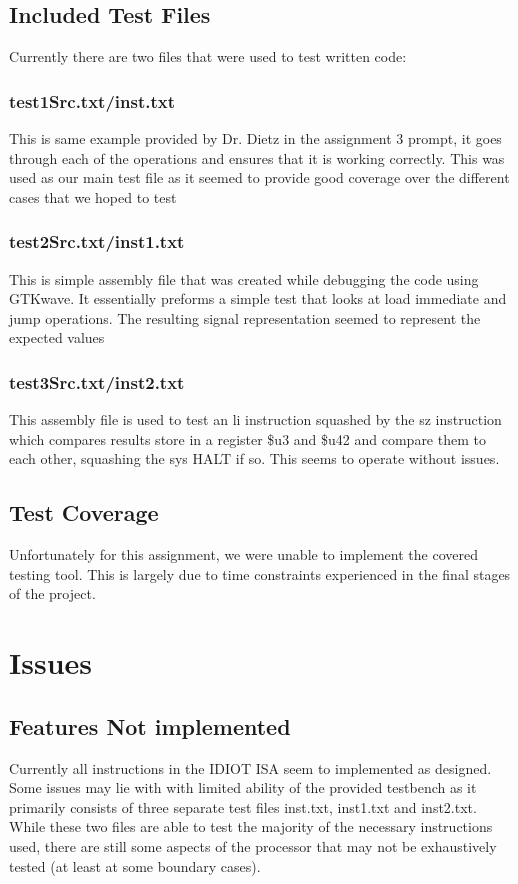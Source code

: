 \documentclass[conference]{IEEEtran}
\begin{document}
\subsection{Included Test Files}
Currently there are two files that were used to test written code:
\subsubsection{test1Src.txt/inst.txt}
This is same example provided by Dr. Dietz in the assignment 3 prompt, it goes through
each of the operations and ensures that it is working correctly. This was used as our main 
test file as it seemed to provide good coverage over the different cases that we hoped to test

\subsubsection{test2Src.txt/inst1.txt}
This is simple assembly file that was created while debugging the code using GTKwave. It essentially preforms a simple test  that looks at load immediate and jump operations. The 
resulting signal representation seemed to represent the expected values

\subsubsection{test3Src.txt/inst2.txt}
This assembly file is used to test an li instruction squashed by the sz instruction which 
compares results store in a register \$u3 and \$u42 and compare them to each other, squashing the sys HALT if so. This seems to operate without issues. 

\subsection{Test Coverage}
Unfortunately for this assignment, we were unable to implement the covered testing tool.
This is largely due to time constraints experienced in the final stages of the project. 

\section{Issues}
\subsection{Features Not implemented}
Currently all instructions in the IDIOT ISA seem to implemented as
designed. Some issues may lie with with limited ability of the provided testbench as 
it primarily consists of three separate test files inst.txt, inst1.txt and inst2.txt.  While these two
files are able to test the majority of the necessary instructions used, there are still some 
aspects of the processor that may not be exhaustively tested (at least at some boundary 
cases). 
\end{document}
